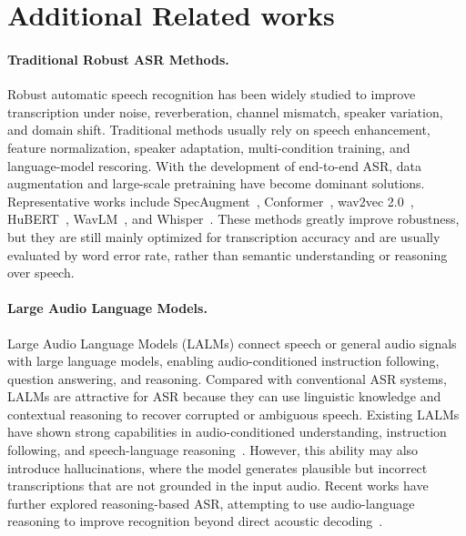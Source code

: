\documentclass{article}
\begin{document}

\section{Additional Related works}
\paragraph{Traditional Robust ASR Methods.}
Robust automatic speech recognition has been widely studied to improve transcription under noise, reverberation, channel mismatch, speaker variation, and domain shift. Traditional methods usually rely on speech enhancement, feature normalization, speaker adaptation, multi-condition training, and language-model rescoring. With the development of end-to-end ASR, data augmentation and large-scale pretraining have become dominant solutions. Representative works include SpecAugment~\cite{park2019specaugment}, Conformer~\cite{conformer}, wav2vec 2.0~\cite{wav2vec}, HuBERT~\cite{hubert}, WavLM~\cite{wavllm}, and Whisper~\cite{whisper}. These methods greatly improve robustness, but they are still mainly optimized for transcription accuracy and are usually evaluated by word error rate, rather than semantic understanding or reasoning over speech.

\paragraph{Large Audio Language Models.}
Large Audio Language Models (LALMs) connect speech or general audio signals with large language models, enabling audio-conditioned instruction following, question answering, and reasoning. Compared with conventional ASR systems, LALMs are attractive for ASR because they can use linguistic knowledge and contextual reasoning to recover corrupted or ambiguous speech. Existing LALMs have shown strong capabilities in audio-conditioned understanding, instruction following, and speech-language reasoning~\cite{LTU,pengi,qwen2.5omni,audiopalm,wavllm,audioflamingo,mini-omni,mini-omni2,stepaudio2,seedasr}. However, this ability may also introduce hallucinations, where the model generates plausible but incorrect transcriptions that are not grounded in the input audio. Recent works have further explored reasoning-based ASR, attempting to use audio-language reasoning to improve recognition beyond direct acoustic decoding~\cite{audio-reasoner,mini-omni-reasoner,huang2025rebellion}.
\end{document}
